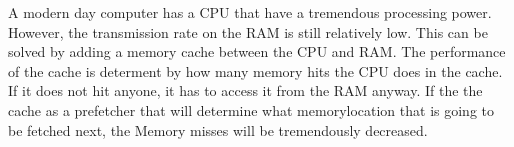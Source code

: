 A modern day computer has a CPU that have a tremendous processing power. However, the transmission rate on the RAM is still relatively low. This can be solved by adding a memory cache between the CPU and RAM. The performance of the cache is determent by how many memory hits the CPU does in the cache. If it does not hit anyone, it has to access it from the RAM anyway. If the the cache as a prefetcher that will determine what memorylocation that is going to be fetched next, the Memory misses will be tremendously decreased. 
